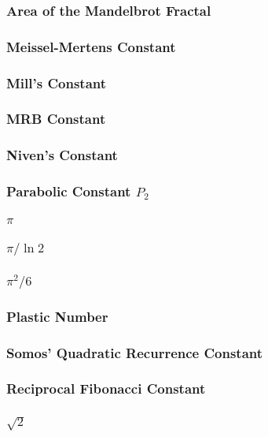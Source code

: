 \documentclass[10pt,a4paper]{report}
\begin{document}
			\subsubsection{Area of the Mandelbrot Fractal}
			\subsubsection{Meissel-Mertens Constant}
			\subsubsection{Mill's Constant}
			\subsubsection{MRB Constant}
			\subsubsection{Niven's Constant}
			\subsubsection{Parabolic Constant $P_2$}
			\subsubsection{$\pi$}
			\subsubsection{$\pi / \ln 2$}
			\subsubsection{$\pi^2 / 6$}
			\subsubsection{Plastic Number}

			\pagebreak

			\subsubsection{Somos' Quadratic Recurrence Constant}
			\subsubsection{Reciprocal Fibonacci Constant}
			\subsubsection{$\sqrt{2}$}
\end{document}
